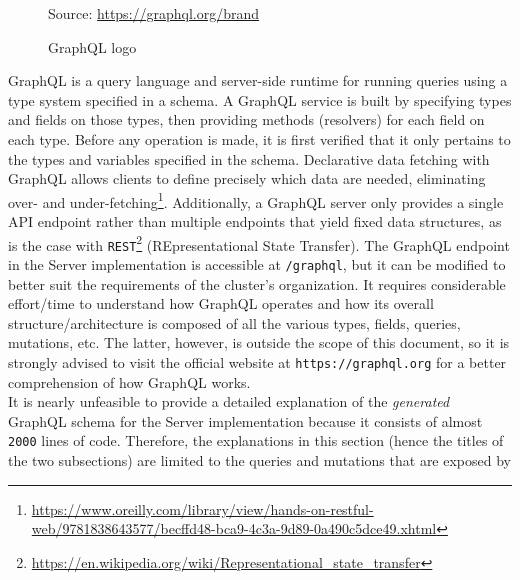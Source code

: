 \begin{figure} %
  \centering
  \def\stackalignment{r} %
  {\scriptsize \parbox[t]{\linewidth}{ Source: \url{https://graphql.org/brand}} }
  \caption{GraphQL logo}
\end{figure}

GraphQL is a query language and server-side runtime for running queries using a
type system specified in a schema. A GraphQL service is built by specifying types
and fields on those types, then providing methods (resolvers) for each field on
each type. Before any operation is made, it is first verified that it only
pertains to the types and variables specified in the schema. Declarative data fetching
with GraphQL allows clients to define precisely which data are needed,
eliminating over- and under-fetching\footnote{\url{https://www.oreilly.com/library/view/hands-on-restful-web/9781838643577/becffd48-bca9-4c3a-9d89-0a490c5dce49.xhtml}}.
Additionally, a GraphQL server only provides a single API endpoint rather than multiple
endpoints that yield fixed data structures, as is the case with \texttt{REST}\footnote{\url{https://en.wikipedia.org/wiki/Representational_state_transfer}}
(REpresentational State Transfer)\cite{graphql}. The GraphQL endpoint in the Server
implementation is accessible at \texttt{/graphql}, but it can be modified to
better suit the requirements of the cluster's organization. It requires considerable
effort/time to understand how GraphQL operates and how its overall structure/architecture
is composed of all the various types, fields, queries, mutations, etc. The
latter, however, is outside the scope of this document, so it is strongly advised
to visit the official website at \texttt{https://graphql.org} for a better
comprehension of how GraphQL works. \\ %
It is nearly unfeasible to provide a detailed explanation of the \textit{generated}
GraphQL schema for the Server implementation because it consists of almost \texttt{2000}
lines of code. Therefore, the explanations in this section (hence the titles of the
two subsections) are limited to the queries and mutations that are exposed by
